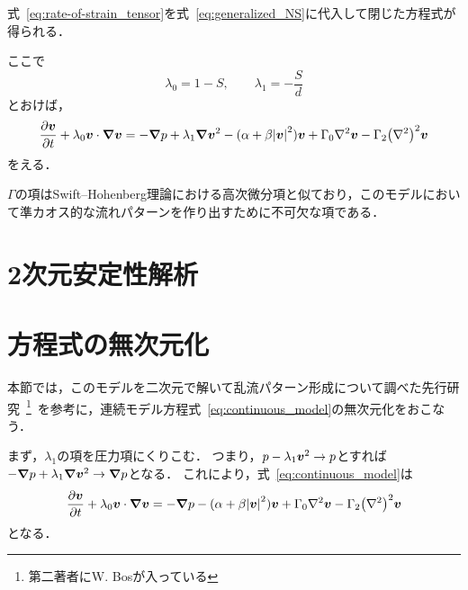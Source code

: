 \documentclass[12pt,dvipdfmx,svgnames,a4paper,uplatex]{ujarticle}
\theoremstyle{plain}
\begin{document}
式~\ref{eq:rate-of-strain_tensor}を式~\ref{eq:generalized_NS}に代入して閉じた方程式が得られる．
ここで
\begin{equation}
  \lambda_0 = 1 - S, \qquad \lambda_1 = -\frac{S}{d}
  \label{eq:def_lambda0_lambda1}
\end{equation}
とおけば，
\begin{equation}
  \pdv{\vb*{v}}{t} + \lambda_0 \vb*{v} \cdot \grad{\vb*{v}} = -\grad{p} + \lambda_1 \grad{\vb*{v}^2} - (\alpha + \beta \abs{\vb*{v}}^2) \vb*{v} + \Gamma_0 \laplacian \vb*{v} - \Gamma_2 \qty(\laplacian)^2 \vb*{v}
  \label{eq:continuous_model}
\end{equation}
をえる．

\(\Gamma\)の項はSwift--Hohenberg理論における高次微分項と似ており，このモデルにおいて準カオス的な流れパターンを作り出すために不可欠な項である．


\section{2次元安定性解析}


\section{方程式の無次元化}

本節では，このモデルを二次元で解いて乱流パターン形成について調べた先行研究~\footnote{第二著者にW. Bosが入っている}~\cite[脚注28]{James2017}を参考に，連続モデル方程式~\ref{eq:continuous_model}の無次元化をおこなう．

まず，\(\lambda_1\)の項を圧力項にくりこむ．
つまり，\(p - \lambda_1 \vb*{v}^2 \to p\)とすれば\(-\grad{p} + \lambda_1 \grad{\vb*{v}^2} \to \grad{p}\)となる．
これにより，式~\ref{eq:continuous_model}は
\begin{equation}
  \pdv{\vb*{v}}{t} + \lambda_0 \vb*{v} \cdot \grad{\vb*{v}} = -\grad{p} - (\alpha + \beta \abs{\vb*{v}}^2) \vb*{v} + \Gamma_0 \laplacian \vb*{v} - \Gamma_2 \qty(\laplacian)^2 \vb*{v}
  \label{eq:continuous_model_absorb_lambda1}
\end{equation}
となる．
\end{document}
